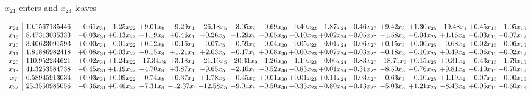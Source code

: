 \documentclass[9pt]{article}
\begin{document}
 $ x_{21} $ enters and $ x_{23} $ leaves 

 \[\begin{array}{c| c c@{\hskip 2pt} c@{\hskip 2pt} c@{\hskip 2pt} c@{\hskip 2pt} c@{\hskip 2pt} c@{\hskip 2pt} c@{\hskip 2pt} c@{\hskip 2pt} c@{\hskip 2pt} c@{\hskip 2pt} c@{\hskip 2pt} c@{\hskip 2pt} c@{\hskip 2pt} c@{\hskip 2pt} c@{\hskip 2pt} }
 x_{21}   &  10.1567135446 & -0.61 x_{31} & -1.25 x_{22} & +  9.01 x_{8} & -9.29 x_{1} & -26.18 x_{5} & -3.05 x_{9} & -0.69 x_{30} & -0.40 x_{23} & -1.87 x_{24} & +  0.46 x_{27} & +  9.42 x_{3} & +  1.30 x_{25} & -19.48 x_{4} & +  0.45 x_{16} & -1.05 x_{19}\\
 x_{13}   &  8.47313035333 & -0.03 x_{31} & +  0.13 x_{22} & -1.19 x_{8} & +  0.46 x_{1} & -0.26 x_{5} & -1.29 x_{9} & -0.05 x_{30} & -0.10 x_{23} & +  0.02 x_{24} & +  0.05 x_{27} & -1.58 x_{3} & -0.04 x_{25} & +  1.16 x_{4} & -0.03 x_{16} & -0.07 x_{19}\\
 x_{10}   &  3.40623091593 & +  0.00 x_{31} & -0.01 x_{22} & +  0.12 x_{8} & +  0.16 x_{1} & -0.07 x_{5} & -0.59 x_{9} & -0.04 x_{30} & -0.05 x_{23} & -0.01 x_{24} & +  0.06 x_{27} & +  0.15 x_{3} & +  0.00 x_{25} & -0.68 x_{4} & +  0.02 x_{16} & -0.06 x_{19}\\
 x_{11}   &  1.81886982418 & +  0.08 x_{31} & +  0.03 x_{22} & -0.15 x_{8} & +  1.21 x_{1} & +  2.03 x_{5} & -0.17 x_{9} & +  0.08 x_{30} & +  0.00 x_{23} & +  0.07 x_{24} & +  0.03 x_{27} & -0.18 x_{3} & -0.10 x_{25} & +  0.49 x_{4} & -0.06 x_{16} & +  0.02 x_{19}\\
 x_{20}   &  110.952234621 & +  0.02 x_{31} & +  1.24 x_{22} & -17.34 x_{8} & +  3.18 x_{1} & -21.16 x_{5} & -20.31 x_{9} & -1.26 x_{30} & -1.19 x_{23} & -0.06 x_{24} & +  0.83 x_{27} & -18.71 x_{3} & +  0.15 x_{25} & +  0.31 x_{4} & -0.43 x_{16} & -1.79 x_{19}\\
 x_{18}   &  41.3253584738 & -0.45 x_{31} & +  1.19 x_{22} & -4.70 x_{8} & +  3.87 x_{1} & -9.65 x_{5} & -2.10 x_{9} & -0.52 x_{30} & -0.83 x_{23} & +  0.01 x_{24} & +  0.31 x_{27} & -8.50 x_{3} & -0.76 x_{25} & +  9.81 x_{4} & -0.10 x_{16} & -0.70 x_{19}\\
 x_{7}   &  6.58945913034 & +  0.03 x_{31} & +  0.09 x_{22} & -0.74 x_{8} & +  0.37 x_{1} & +  1.78 x_{5} & -0.45 x_{9} & +  0.01 x_{30} & +  0.01 x_{23} & +  0.11 x_{24} & +  0.03 x_{27} & -0.63 x_{3} & -0.10 x_{25} & +  1.19 x_{4} & -0.07 x_{16} & -0.00 x_{19}\\
 x_{32}   &  25.3550985056 & -0.36 x_{31} & +  0.46 x_{22} & -7.31 x_{8} & -12.37 x_{1} & -12.58 x_{5} & -9.01 x_{9} & -0.50 x_{30} & -0.35 x_{23} & -0.80 x_{24} & -0.13 x_{27} & -5.03 x_{3} & +  1.21 x_{25} & -8.43 x_{4} & +  0.05 x_{16} & -0.60 x_{19}\\

\end{array}\]
\end{document}
